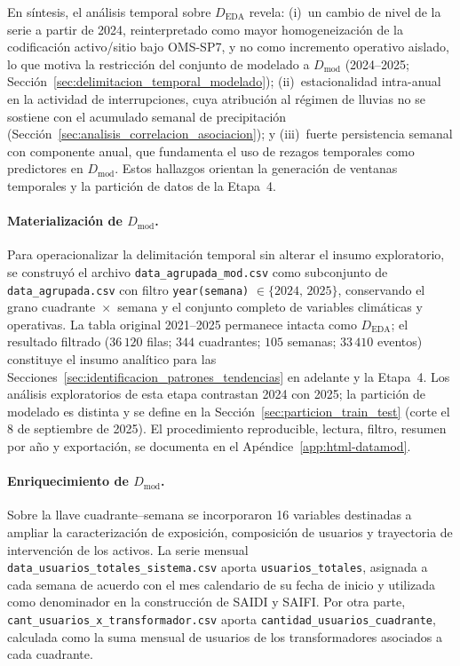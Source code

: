     
    
    \noindent En síntesis, el análisis temporal sobre $D_{\mathrm{EDA}}$ revela: (i)~un cambio de nivel de la serie a partir de 2024, reinterpretado como mayor homogeneización de la codificación activo/sitio bajo OMS-SP7, y no como incremento operativo aislado, lo que motiva la restricción del conjunto de modelado a $D_{\mathrm{mod}}$ (2024--2025; Sección~\ref{sec:delimitacion_temporal_modelado}); (ii)~estacionalidad intra-anual en la actividad de interrupciones, cuya atribución al régimen de lluvias no se sostiene con el acumulado semanal de precipitación (Sección~\ref{sec:analisis_correlacion_asociacion}); y (iii)~fuerte persistencia semanal con componente anual, que fundamenta el uso de rezagos temporales como predictores en $D_{\mathrm{mod}}$. Estos hallazgos orientan la generación de ventanas temporales y la partición de datos de la Etapa~4.
    
    \paragraph{Materialización de $D_{\mathrm{mod}}$.} Para operacionalizar la delimitación temporal sin alterar el insumo exploratorio, se construyó el archivo \texttt{data\_agrupada\_mod.csv} como subconjunto de \texttt{data\_agrupada.csv} con filtro \texttt{year(semana)} $\in \{2024,\,2025\}$, conservando el grano cuadrante~$\times$~semana y el conjunto completo de variables climáticas y operativas. La tabla original 2021--2025 permanece intacta como $D_{\mathrm{EDA}}$; el resultado filtrado ($36\,120$ filas; $344$ cuadrantes; $105$ semanas; $33\,410$ eventos) constituye el insumo analítico para las Secciones~\ref{sec:identificacion_patrones_tendencias} en adelante y la Etapa~4. Los análisis exploratorios de esta etapa contrastan 2024 con 2025; la partición de modelado es distinta y se define en la Sección~\ref{sec:particion_train_test} (corte el 8 de septiembre de 2025). El procedimiento reproducible, lectura, filtro, resumen por año y exportación, se documenta en el Apéndice~\ref{app:html-datamod}.

    \paragraph{Enriquecimiento de $D_{\mathrm{mod}}$.} Sobre la llave
    cuadrante--semana se incorporaron 16 variables destinadas a ampliar la
    caracterización de exposición, composición de usuarios y trayectoria de
    intervención de los activos. La serie mensual
    \texttt{data\_usuarios\_totales\_sistema.csv} aporta
    \texttt{usuarios\_totales}, asignada a cada semana de acuerdo con el mes
    calendario de su fecha de inicio y utilizada como denominador en la
    construcción de SAIDI y SAIFI. Por otra parte,
    \texttt{cant\_usuarios\_x\_transformador.csv} aporta
    \texttt{cantidad\_usuarios\_cuadrante}, calculada como la suma mensual de
    usuarios de los transformadores asociados a cada cuadrante.

